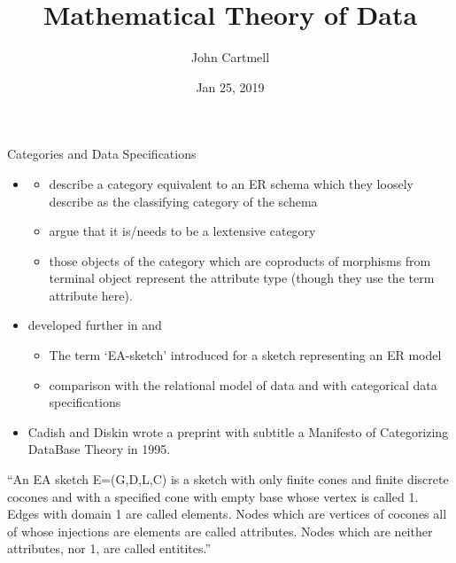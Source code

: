 \documentclass[xcolor=pst,dvips]{beamer}   %
\title[John Cartmell]{Mathematical Theory of Data}
\author{John Cartmell}
\institute{ad otium}
\date{Jan 25, 2019}
\begin{document}
\section{\MToDsection}
\subsection{\MToDsubsectionLiterature}

\begin{frame}
\titlepage
\end{frame}


\begin{frame}{Categories and Data Specifications}
\begin{itemize} \footnotesize
\item  \cite{Johnson93} 
\begin{itemize} 
\item describe a category equivalent to an ER schema which they loosely describe as the classifying category of the schema
\item argue that it is/needs to be a lextensive category
\item those objects of the category which are coproducts of morphisms from terminal object represent the attribute type (though they use the term attribute here).
\end{itemize}
\pause \item developed further in \cite{johnson2002REL} and \cite{Johnson2002ERA}
\begin{itemize} \footnotesize
\pause \item The term `EA-sketch' introduced for a sketch representing an ER model 
\pause \item comparison with the relational model of data and with categorical data specifications\cite{piessens1995}
\end{itemize}
\pause \item Cadish and Diskin wrote a preprint with subtitle a Manifesto of Categorizing DataBase Theory in 1995.
\end{itemize}
\end{frame}

\begin{frame}{\cite{Johnson2002ERA}}

``An EA sketch E=(G,D,L,C) is a sketch with only finite cones and finite discrete cocones and with a 
specified cone with empty base whose vertex is called 1. Edges with domain 1 are called elements. 
Nodes which are vertices of cocones all of whose injections are elements are called attributes. 
Nodes which are neither attributes, nor 1, are called entitites.''
\end{frame}
\end{document}
